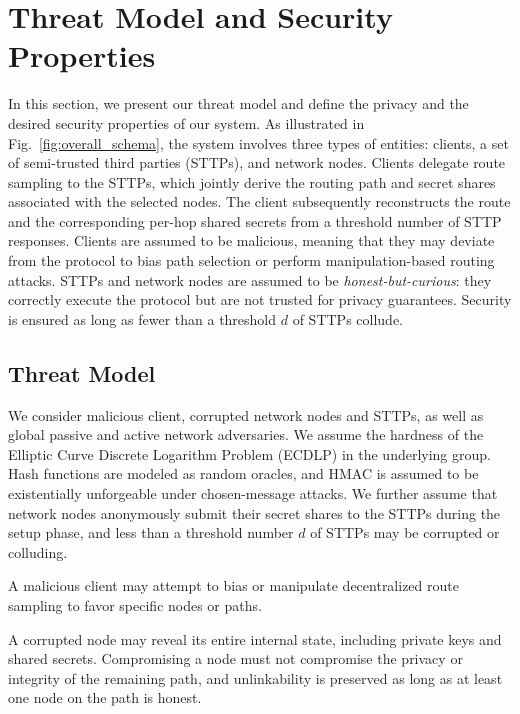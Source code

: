 
\section{Threat Model and Security Properties}\label{sec:sys_model}

In this section, we present our threat model and define the privacy and the desired security properties of our system.
As illustrated in Fig.~\ref{fig:overall_schema}, the system involves three types of entities: clients, a set of semi-trusted third parties (STTPs), and network nodes. 
Clients delegate route sampling to the STTPs, which jointly derive the routing path and secret shares associated with the selected nodes. 
The client subsequently reconstructs the route and the corresponding per-hop shared secrets from a threshold number of STTP responses.
Clients are assumed to be malicious, meaning that they may deviate from the protocol to bias path selection or perform manipulation-based routing attacks. 
STTPs and network nodes are assumed to be \emph{honest-but-curious}: they correctly execute the protocol but are not trusted for privacy guarantees. 
Security is ensured as long as fewer than a threshold $d$ of STTPs collude.

\subsection{Threat Model}

We consider malicious client, corrupted network nodes and STTPs, as well as global passive and active network adversaries. 
We assume the hardness of the Elliptic Curve Discrete Logarithm Problem (ECDLP) in the underlying group.
Hash functions are modeled as random oracles, and HMAC is assumed to be existentially unforgeable under chosen-message attacks.
We further assume that network nodes anonymously submit their secret shares to the STTPs during the setup phase, and less than a threshold number $d$ of STTPs may be corrupted or colluding.

\smallskip
{}
A malicious client may attempt to bias or manipulate decentralized route sampling to favor specific nodes or paths.

\smallskip
{}
A corrupted node may reveal its entire internal state, including private keys and shared secrets.
Compromising a node must not compromise the privacy or integrity of the remaining path, and unlinkability is preserved as long as at least one node on the path is honest.

